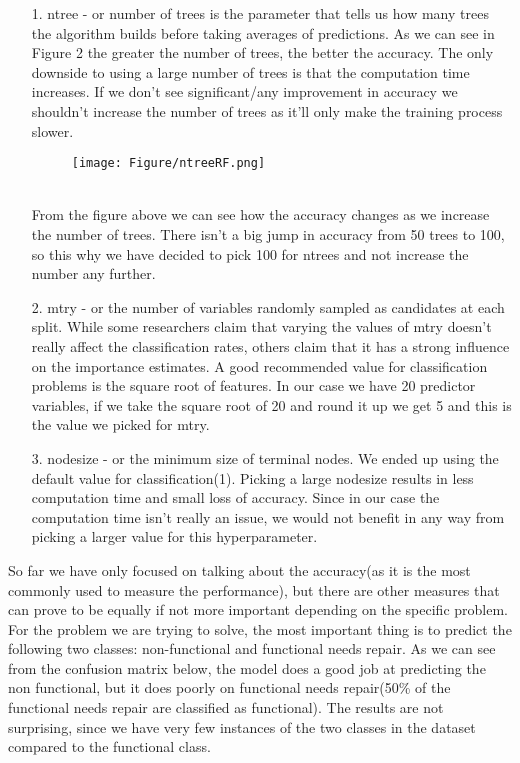 \begin{enumerate}
    \item[1.] ntree - or number of trees is the parameter that tells us how many trees the algorithm builds before taking averages of predictions. As we can see in Figure 2 the greater the number of trees, the better the accuracy. The only downside to using a large number of trees is that the computation time increases. If we don't see significant/any improvement in accuracy we shouldn't increase the number of trees as it'll only make the training process slower.
    \begin{figure}[h]
\texttt{[image: Figure/ntreeRF.png]}
\centering
\end{figure}\\
From the figure above we can see how the accuracy changes as we increase the number of trees. There isn't a big jump in accuracy from 50 trees to 100, so this why we have decided to pick 100 for ntrees and not increase the number any further.
    \item[2.] mtry - or the number of variables randomly sampled as candidates at each split. While some researchers claim that varying the values of mtry doesn't really affect the classification rates, others claim that it has a strong influence on the importance estimates. A good recommended value for classification problems is the square root of features. In our case we have 20 predictor variables, if we take the square root of 20 and round it up we get 5 and this is the value we picked for mtry.
    \item[3.] nodesize - or the minimum size of terminal nodes. We ended up using the default value for classification(1). Picking a large nodesize results in less computation time and small loss of accuracy. Since in our case the computation time isn't really an issue, we would not benefit in any way from picking a larger value for this hyperparameter.
\end{enumerate}
So far we have only focused on talking about the accuracy(as it is the most commonly used to measure the performance), but there are other measures that can prove to be equally if not more important depending on the specific problem.\\
For the problem we are trying to solve, the most important thing is to predict the following two classes: non-functional and functional needs repair. As we can see from the confusion matrix below, the model does a good job at predicting the non functional, but it does poorly on functional needs repair(50\% of the functional needs repair are classified as functional). The results are not surprising, since we have very few instances of the two classes in the dataset compared to the functional class.
